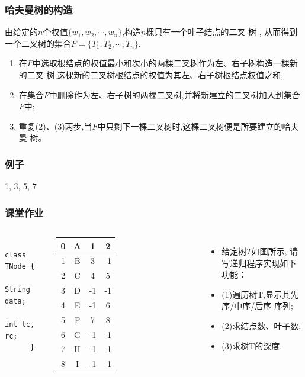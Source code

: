 \begin{frame}[fragile]
  \frametitle{哈夫曼树的构造}

  由给定的$n$个权值$\{w_1, w_2, \cdots, w_n\}$,构造$n$棵只有一个叶子结点的二叉
  树 , 从而得到一个二叉树的集合$F=\{T_1, T_2, \cdots, T_n\}$.

  \begin{enumerate}
  \item 在$F$中选取根结点的权值最小和次小的两棵二叉树作为左、右子树构造一棵新的二叉
    树,这棵新的二叉树根结点的权值为其左、右子树根结点权值之和;
  \item 在集合$F$中删除作为左、右子树的两棵二叉树,并将新建立的二叉树加入到集合
    $F$中;
  \item 重复(2)、(3)两步,当$F$中只剩下一棵二叉树时,这棵二叉树便是所要建立的哈夫曼
    树。
  \end{enumerate}
\end{frame}

\begin{frame}[fragile]
  \frametitle{例子}
  1, 3, 5, 7
\end{frame}

\begin{frame}[fragile]
  \frametitle{课堂作业}
  \begin{columns}

    \begin{verbatim}
      class TNode {
        String data;
        int lc, rc;
      }
    \end{verbatim}

    \begin{tabular}{c | c | c | c|}
      \hline
      0 & A & 1 & 2 \\ \hline
      1 & B & 3 & -1 \\ \hline
      2 & C & 4 & 5 \\ \hline
      3 & D & -1 & -1 \\ \hline
      4 & E & -1 & 6 \\ \hline
      5 & F & 7 & 8 \\ \hline
      6 & G & -1 & -1 \\ \hline
      7 & H & -1 & -1 \\ \hline
      8 & I & -1 & -1 \\ \hline
    \end{tabular}

    \begin{itemize}
    \item 给定树$T$如图所示, 请写递归程序实现如下功能：
    \item (1)遍历树T,显示其先序/中序/后序 序列;
    \item (2)求结点数、叶子数;
    \item (3)求树T的深度.
    \end{itemize}
  \end{columns}
\end{frame}

